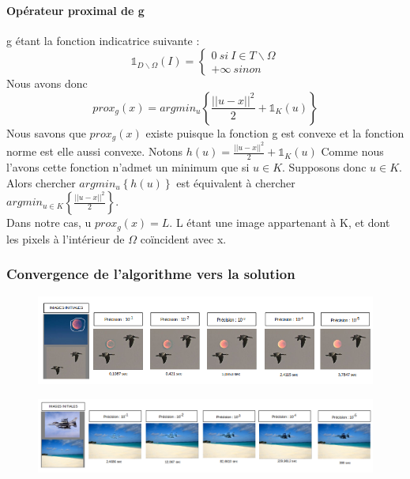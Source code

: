 \paragraph{Opérateur proximal de g}
g étant la fonction indicatrice suivante : 
\begin{equation*}
\mathbb{1}_{ D \backslash \Omega }(I) =
	\left\{
	\begin{aligned}{}
	0 \ si\  I \in T \backslash \Omega \\
	+ \infty \ sinon
    \end{aligned}
    \right.
\end{equation*}{}
Nous avons donc 
\begin{equation*}
prox_g(x) =  argmin_u\left\{\frac{||u-x||^2}{2}+ \mathbb{1}_K(u)\right\}
\end{equation*}
Nous savons que $prox_g(x)$ existe puisque la fonction g est convexe et la fonction norme est elle aussi convexe.
Notons $h(u) = \frac{||u-x||^2}{2}+ \mathbb{1}_K(u)$ 
Comme nous l'avons cette fonction n'admet un minimum que si $u \in K$. Supposons donc $u \in K$. Alors chercher $argmin_u \left\{h(u)\right\}$ est équivalent à chercher $argmin_{u\in K} \left\{\frac{||u-x||^2}{2}\right\}$.\\
Dans notre cas, u $prox_g(x) = L$.
L étant une image appartenant à K, et dont les pixels à l'intérieur de $\Omega$ coïncident avec x.\\
\subsubsection{Convergence de l'algorithme vers la solution}
\begin{figure}[!h]
\includegraphics[scale=0.5]{Images/Resultats/conv1.png}
\end{figure}
\begin{figure}[!h]
\includegraphics[scale=0.4]{Images/Resultats/conv2.png}
\end{figure}


